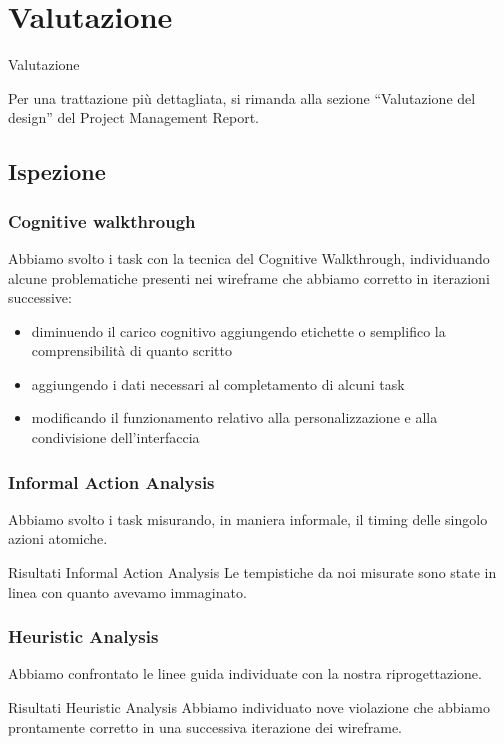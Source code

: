 \documentclass[handout]{beamer}
\begin{document}
	\section{Valutazione}
		\begin{frame}
			\centering
			\begin{Huge}
				Valutazione
			\end{Huge}
			\mbox{}
			\vfill
			\vspace*{100px}
			\begin{tiny}
				Per una trattazione più dettagliata, si rimanda alla sezione ``Valutazione del design'' del Project Management Report.
			\end{tiny}
		\end{frame}
		\subsection{Ispezione}
		\begin{frame}
			\frametitle{Cognitive walkthrough}
			Abbiamo svolto i task con la tecnica del Cognitive Walkthrough, individuando alcune problematiche presenti nei wireframe che abbiamo corretto in iterazioni successive:
			\begin{itemize}[<+->]
				\item diminuendo il carico cognitivo aggiungendo etichette o semplifico la comprensibilità di quanto scritto\\
				\item aggiungendo i dati necessari al completamento di alcuni task\\
				\item modificando il funzionamento relativo alla personalizzazione e alla condivisione dell'interfaccia\\
			\end{itemize}
		\end{frame}

		\begin{frame}
			\frametitle{Informal Action Analysis}
			Abbiamo svolto i task misurando, in maniera informale, il timing delle singolo azioni atomiche. \newline \newline
			\begin{block}{Risultati Informal Action Analysis}
			Le tempistiche da noi misurate sono state in linea con quanto avevamo immaginato.
		\end{block}
		\end{frame}

		\begin{frame}
			\frametitle{Heuristic Analysis}
			Abbiamo confrontato le linee guida individuate con la nostra riprogettazione. \newline \newline
			\begin{block}{Risultati Heuristic Analysis}
				Abbiamo individuato nove violazione che abbiamo prontamente corretto in una successiva iterazione dei wireframe.
		\end{block}
		\end{frame}
\end{document}
